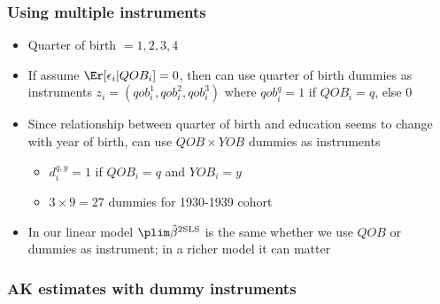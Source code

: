 \begin{frame}[shrink]\frametitle{Using multiple instruments}
  \begin{itemize}
  \item Quarter of birth $=1,2,3,4$
  \item If assume $\Er[\epsilon_i | QOB_i] = 0$, then can use quarter
    of birth dummies as instruments
    $z_i = (qob^1_i,qob^2_i,qob^3_i)$ where $qob^q_i = 1$ if $QOB_i =
    q$, else $0$
  \item Since relationship between quarter of birth and education
    seems to change with year of birth, can use $QOB \times YOB$
    dummies as instruments 
    \begin{itemize}
    \item $d_i^{q,y} = 1$ if $QOB_i = q$ and $YOB_i = y$
    \item $3 \times 9 = 27$ dummies for 1930-1939 cohort
    \end{itemize}    
  \item In our linear model $\plim \btsls$ is the same whether we use
    $QOB$ or dummies as instrument; in a richer model it can matter 
  \end{itemize}
\end{frame}

\begin{frame}\frametitle{AK estimates with dummy instruments}
  {\footnotesize{}}
\end{frame}

